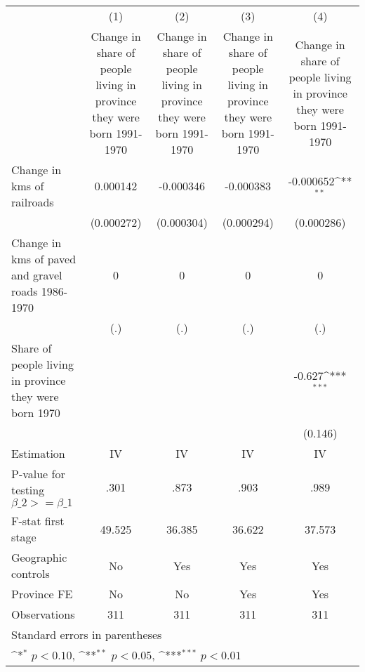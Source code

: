{
\def\sym#1{\ifmmode^{#1}\else\(^{#1}\)\fi}
\begin{tabular}{l*{4}{c}}
\hline\hline
                &\multicolumn{1}{c}{(1)}&\multicolumn{1}{c}{(2)}&\multicolumn{1}{c}{(3)}&\multicolumn{1}{c}{(4)}\\
                &\multicolumn{1}{c}{Change in share of people living in province they were born 1991-1970}&\multicolumn{1}{c}{Change in share of people living in province they were born 1991-1970}&\multicolumn{1}{c}{Change in share of people living in province they were born 1991-1970}&\multicolumn{1}{c}{Change in share of people living in province they were born 1991-1970}\\
\hline
Change in kms of railroads& 0.000142         &-0.000346         &-0.000383         &-0.000652\sym{**} \\
                &(0.000272)         &(0.000304)         &(0.000294)         &(0.000286)         \\
[1em]
Change in kms of paved and gravel roads 1986-1970&        0         &        0         &        0         &        0         \\
                &      (.)         &      (.)         &      (.)         &      (.)         \\
[1em]
Share of people living in province they were born 1970&                  &                  &                  &   -0.627\sym{***}\\
                &                  &                  &                  &  (0.146)         \\
\hline
Estimation      &       IV         &       IV         &       IV         &       IV         \\
P-value for testing $\beta\_2 >= \beta\_1$&     .301         &     .873         &     .903         &     .989         \\
F-stat first stage&   49.525         &   36.385         &   36.622         &   37.573         \\
Geographic controls&       No         &      Yes         &      Yes         &      Yes         \\
Province FE     &       No         &       No         &      Yes         &      Yes         \\
Observations    &      311         &      311         &      311         &      311         \\
\hline\hline
\multicolumn{5}{l}{\footnotesize Standard errors in parentheses}\\
\multicolumn{5}{l}{\footnotesize \sym{*} \(p<0.10\), \sym{**} \(p<0.05\), \sym{***} \(p<0.01\)}\\
\end{tabular}
}
